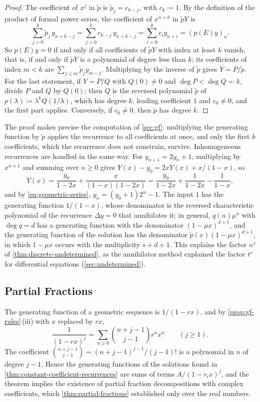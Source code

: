 \begin{proof}
The coefficient of $x^j$ in $\tilde p$ is $\tilde p_j=c_{k-j}$, with $c_k\coloneqq1$. By the definition of the product of formal power series, the coefficient of $x^{n+k}$ in $\tilde pY$ is
\[
\sum_{j=0}^k\tilde p_j\,y_{n+k-j}=\sum_{j=0}^kc_{k-j}\,y_{n+k-j}=\sum_{i=0}^kc_iy_{n+i}=(p(E)y)_n .
\]
So $p(E)y=0$ if and only if all coefficients of $\tilde pY$ with index at least $k$ vanish, that is, if and only if $\tilde pY$ is a polynomial of degree less than $k$; its coefficients of index $m<k$ are $\sum_{j\le m}\tilde p_jy_{m-j}$. Multiplying by the inverse of $\tilde p$ gives $Y=P/\tilde p$. For the last statement, if $Y=P/Q$ with $Q(0)\ne0$ and $\deg P<\deg Q\eqqcolon k$, divide $P$ and $Q$ by $Q(0)$; then $Q$ is the reversed polynomial $\tilde p$ of $p(\lambda)\coloneqq\lambda^kQ(1/\lambda)$, which has degree $k$, leading coefficient $1$ and $c_0\ne0$, and the first part applies. Conversely, if $c_0\ne0$, then $\tilde p$ has degree $k$.
\end{proof}

The proof makes precise the computation of \cref{sec:gf}: multiplying the generating function by $\tilde p$ applies the recurrence to all coefficients at once, and only the first $k$ coefficients, which the recurrence does not constrain, survive. Inhomogeneous recurrences are handled in the same way. For $y_{n+1}=2y_n+1$, multiplying by $x^{n+1}$ and summing over $n\ge0$ gives $Y(x)-y_0=2xY(x)+x/(1-x)$, so
\[
Y(x)=\frac{y_0}{1-2x}+\frac x{(1-x)(1-2x)}=\frac{y_0}{1-2x}+\frac1{1-2x}-\frac1{1-x},
\]
and by \eqref{eq:geometric-series}, $y_n=(y_0+1)2^n-1$. The input $1$ has the generating function $1/(1-x)$, whose denominator is the reversed characteristic polynomial of the recurrence $\Delta y=0$ that annihilates it; in general, $q(n)\mu^n$ with $\deg q=d$ has a generating function with the denominator $(1-\mu x)^{d+1}$, and the generating function of the solution has the denominator $\tilde p(x)(1-\mu x)^{d+1}$, in which $1-\mu x$ occurs with the multiplicity $s+d+1$. This explains the factor $n^s$ of \cref{thm:discrete-undetermined}, as the annihilator method explained the factor $t^s$ for differential equations (\cref{sec:undetermined}).

\subsection{Partial Fractions}

The generating function of a geometric sequence is $1/(1-rx)$, and by \cref{prop:gf-rules}\,(iii) with $x$ replaced by $rx$,
\begin{equation}
\frac1{(1-rx)^j}=\sum_{n\ge0}\binom{n+j-1}{j-1}r^nx^n\qquad(j\ge1).
\label{eq:gf-power-of-geometric}
\end{equation}
The coefficient $\binom{n+j-1}{j-1}=(n+j-1)^{\underline{j-1}}/(j-1)!$ is a polynomial in $n$ of degree $j-1$. Hence the generating functions of the solutions found in \cref{thm:constant-coefficient-recurrences} are sums of terms $A/(1-r_ix)^j$, and the theorem implies the existence of partial fraction decompositions with complex coefficients, which \cref{thm:partial-fractions} established only over the real numbers.

